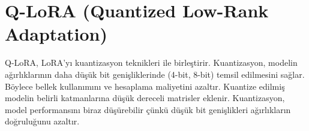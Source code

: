 \section{Q-LoRA (Quantized Low-Rank Adaptation)}

Q-LoRA, LoRA'yı kuantizasyon teknikleri ile birleştirir. Kuantizasyon, modelin ağırlıklarının daha düşük bit genişliklerinde (4-bit, 8-bit) temsil edilmesini sağlar. Böylece bellek kullanımını ve hesaplama maliyetini azaltır. Kuantize edilmiş modelin belirli katmanlarına düşük dereceli matrisler eklenir. Kuantizasyon, model performansını biraz düşürebilir çünkü düşük bit genişlikleri ağırlıkların doğruluğunu azaltır.


\newpage